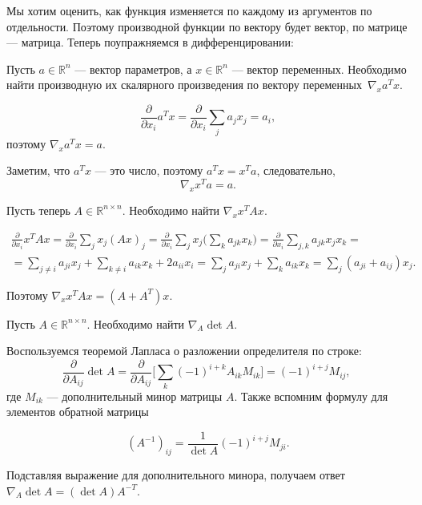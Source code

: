 \documentclass[12pt,fleqn]{article}
\begin{document}
Мы хотим оценить, как функция изменяется по каждому из аргументов по отдельности. Поэтому производной функции по вектору будет вектор, по матрице --- матрица. Теперь поупражняемся в дифференцировании:

\begin{vkProblem} Пусть $a \in \mathbb{R}^n$ --- вектор параметров, а $x \in \mathbb{R}^n$ --- вектор переменных. Необходимо найти производную их скалярного произведения по вектору переменных~$\nabla_x a^Tx$. 
\end{vkProblem}

\begin{esSolution}
\[
    \frac{\partial}{\partial x_i} a^Tx = \frac{\partial}{\partial x_i}\sum_j a_jx_j = a_i,
\]поэтому $\nabla_x a^Tx = a. $

    Заметим, что $a^Tx$ — это число, поэтому $a^Tx = x^Ta$, следовательно, 
    \[\nabla_x x^Ta = a.\]
\end{esSolution}

\begin{vkProblem} Пусть теперь $A \in \mathbb{R}^{n\times n}$. Необходимо найти $\nabla_x x^TAx$.
\end{vkProblem} 
    
\begin{esSolution}
\begin{multline*}
    \frac{\partial}{\partial x_i} x^TAx = \frac{\partial}{\partial x_i}\sum_j x_j (Ax)_j = \frac{\partial}{\partial x_i}\sum_j x_j \bigg(\sum_k a_{jk}x_k\bigg) = \frac{\partial}{\partial x_i}\sum_{j,k} a_{jk} x_j x_k = \\
 = \sum_{j \neq i} a_{ji} x_j + \sum_{k \neq i} a_{ik} x_k + 2a_{ii}x_i = \sum_{j} a_{ji} x_j + \sum_{k} a_{ik} x_k = \sum_{j} (a_{ji} + a_{ij}) x_j.
\end{multline*}
    
Поэтому $\nabla_x x^TAx = (A + A^T)x$.
    
\end{esSolution}
    
\begin{vkProblem} Пусть $A \in \mathbb{R}^{n\times n}$. Необходимо найти $\nabla_A \det A$.
\end{vkProblem}
    
\begin{esSolution} Воспользуемся теоремой Лапласа о разложении определителя по строке:
    \[\frac{\partial}{\partial A_{ij}} \det A = \frac{\partial}{\partial A_{ij}}\bigg[\sum_k (-1)^{i+k}A_{ik}M_{ik}\bigg] = (-1)^{i+j}M_{ij}, \; \]
где $M_{ik}$ --- дополнительный минор матрицы $A$. Также вспомним формулу для элементов обратной матрицы
    
    \[(A^{-1})_{ij} = \frac{1}{\det A}(-1)^{i+j}M_{ji}.\]
    
    Подставляя выражение для дополнительного минора, получаем ответ $\nabla_A \det A = (\det A) A^{-T}$.
\end{esSolution}
\end{document}
